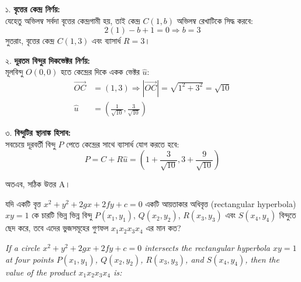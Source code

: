 \documentclass[12pt, a4paper]{article}
\begin{document}
\begin{tcolorbox}[solutionbox={সমাধান (Solution)}]
    \noindent
    ১. \textbf{বৃত্তের কেন্দ্র নির্ণয়:} \\
    যেহেতু অভিলম্ব সর্বদা বৃত্তের কেন্দ্রগামী হয়, তাই কেন্দ্র $C(1, b)$ অভিলম্ব রেখাটিকে সিদ্ধ করবে:
    \[ 2(1) - b + 1 = 0 \Rightarrow b = 3 \]
    সুতরাং, বৃত্তের কেন্দ্র $C(1, 3)$ এবং ব্যাসার্ধ $R = 3$।
    
    \vspace{0.5em}
    ২. \textbf{দূরতম বিন্দুর দিকভেক্টর নির্ণয়:} \\
    মূলবিন্দু $O(0,0)$ হতে কেন্দ্রের দিকে একক ভেক্টর $\hat{u}$:
    \begin{align*}
        \vec{OC} &= (1, 3) \Rightarrow |\vec{OC}| = \sqrt{1^2 + 3^2} = \sqrt{10} \\
        \hat{u} &= \left(\frac{1}{\sqrt{10}}, \frac{3}{\sqrt{10}}\right)
    \end{align*}
    
    \vspace{0.5em}
    ৩. \textbf{বিন্দুটির স্থানাঙ্ক হিসাব:} \\
    সবচেয়ে দূরবর্তী বিন্দু $P$ পেতে কেন্দ্রের সাথে ব্যাসার্ধ যোগ করতে হবে:
    \[ P = C + R\hat{u} = \left(1 + \frac{3}{\sqrt{10}}, 3 + \frac{9}{\sqrt{10}}\right) \]
    
    \vspace{0.5em}
    অতএব, সঠিক উত্তর A।
\end{tcolorbox}

\begin{tcolorbox}[questionbox={প্রশ্ন (Question) 22}]
    \noindent
    যদি একটি বৃত্ত $x^2 + y^2 + 2gx + 2fy + c = 0$ একটি আয়তাকার অধিবৃত্ত (rectangular hyperbola) $xy = 1$ কে চারটি ভিন্ন ভিন্ন বিন্দু $P(x_1, y_1)$, $Q(x_2, y_2)$, $R(x_3, y_3)$ এবং $S(x_4, y_4)$ বিন্দুতে ছেদ করে, তবে এদের ভুজসমূহের গুণফল $x_1 x_2 x_3 x_4$ এর মান কত?
    
    \vspace{0.8em}
    \begin{english}
    \noindent\textit{\color{darkgray}
    If a circle $x^2 + y^2 + 2gx + 2fy + c = 0$ intersects the rectangular hyperbola $xy = 1$ at four points $P(x_1, y_1)$, $Q(x_2, y_2)$, $R(x_3, y_3)$, and $S(x_4, y_4)$, then the value of the product $x_1 x_2 x_3 x_4$ is:
    }
    \end{english}
\end{tcolorbox}
\end{document}
